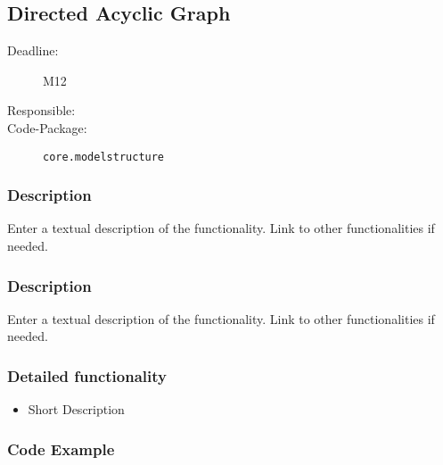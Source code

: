 \newpage
\subsection{Directed Acyclic Graph}
\label{Functionality:ID}

\begin{description}
\item[Deadline:] M12
\item[Responsible:]
\item[Code-Package:] \texttt{core.modelstructure}
\end{description}

\subsubsection*{Description}

Enter a textual description of the functionality. Link to other functionalities if needed. 


\subsubsection*{Description}

Enter a textual description of the functionality. Link to other functionalities if needed. 

\subsubsection*{Detailed functionality}

\begin{itemize}
\item Short Description
\end{itemize}

\subsubsection*{Code Example}



